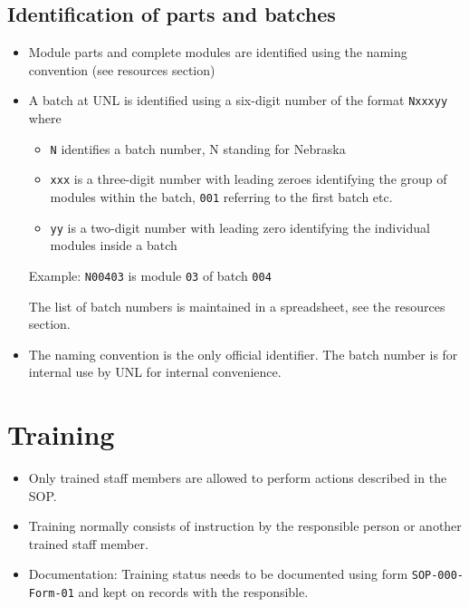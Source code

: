 \documentclass[12pt]{unlsilabsop}
\begin{document}
\subsection{Identification of parts and batches}
\begin{itemize}
    \item Module parts and complete modules are identified using the naming convention (see resources section)
    \item A batch at UNL is identified using a six-digit number of the format \texttt{Nxxxyy} where
    \begin{itemize}
	\item \texttt{N} identifies a batch number, N standing for Nebraska
	\item \texttt{xxx} is a three-digit number with leading zeroes identifying the group of modules within the batch, \texttt{001} referring to the first batch etc.
	\item \texttt{yy} is a two-digit number with leading zero identifying the individual modules inside a batch
    \end{itemize}
    Example: \texttt{N00403} is module \texttt{03} of batch \texttt{004}

    The list of batch numbers is maintained in a spreadsheet, see the resources section.
    \item The naming convention is the only official identifier. The batch number is for internal use by UNL for internal convenience.
\end{itemize}

\section{Training}
\begin{itemize}
\item Only trained staff members are allowed to perform actions described in the SOP.
\item Training normally consists of instruction by the responsible person or another trained staff member.
\item Documentation: Training status needs to be documented using form \texttt{SOP-000-Form-01} and kept on records with the responsible.
\end{itemize}

\end{document}
